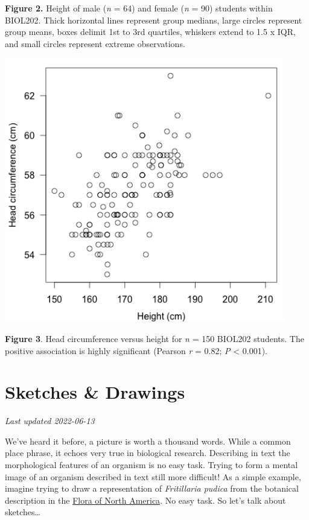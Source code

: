 \documentclass[
]{book}
\begin{document}
\textbf{Figure 2.} Height of male (\emph{n} = 64) and female (\emph{n} = 90) students within BIOL202. Thick horizontal lines represent group medians, large circles represent group means, boxes delimit 1st to 3rd quartiles, whiskers extend to 1.5 x IQR, and small circles represent extreme observations.

\includegraphics{images/FT_fig-3.png}

\textbf{Figure 3}. Head circumference versus height for \emph{n} = 150 BIOL202 students. The positive association is highly significant (Pearson \emph{r} = 0.82; \emph{P} \textless{} 0.001).

\hypertarget{sketches-drawings}{%
\chapter{Sketches \& Drawings}\label{sketches-drawings}}

\emph{Last updated 2022-06-13}

We've heard it before, a picture is worth a thousand words. While a common place phrase, it echoes very true in biological research. Describing in text the morphological features of an organism is no easy task. Trying to form a mental image of an organism described in text still more difficult! As a simple example, imagine trying to draw a representation of \emph{Fritillaria pudica} from the botanical description in the \href{http://www.efloras.org/florataxon.aspx?flora_id=1\&taxon_id=242101628}{Flora of North America}. No easy task. So let's talk about sketches\ldots{}
\end{document}

